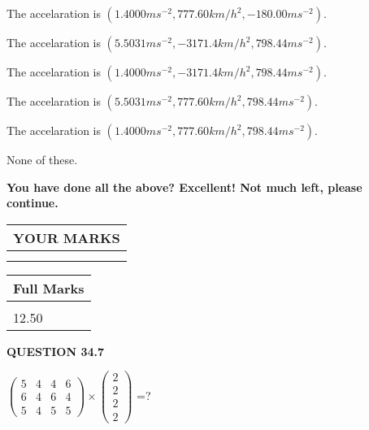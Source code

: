 \documentclass[12pt]{article}
\begin{document}
 
The accelaration is
$(
1.4000ms^{-2},
777.60km/h^2,
-180.00ms^{-2}
).
$
 
 
The accelaration is
$(
5.5031ms^{-2},
-3171.4km/h^2,
798.44ms^{-2}
).
$
 
 
The accelaration is
$(
1.4000ms^{-2},
-3171.4km/h^2,
798.44ms^{-2}
).
$
 
 
The accelaration is
$(
5.5031ms^{-2},
777.60km/h^2,
798.44ms^{-2}
).
$
 
 
The accelaration is
$(
1.4000ms^{-2},
777.60km/h^2,
798.44ms^{-2}
).
$
 
 
 None of these.
 
 
 
 

 
\vspace{0.3in}
   
   
\vspace{0.3in}
{\textbf{\LARGE{You have done all the above? Excellent! Not much left, please continue.}}}
\vspace{0.3in}
   
   
  
\vspace{0.2in}
  
\noindent\begin{tabular}{|l|}
\hline
 YOUR MARKS  \\
\hline
 \\ 
 \\ 
\hline
\end{tabular}
\hspace{0.05in} \begin{tabular}{|l|}
\hline
 Full Marks  \\
\hline
 \\ 
12.50 \\
\hline
\end{tabular}
{\textbf{\Large{QUESTION
34.7 
}}}
  
  
 
$ \left( \begin{array}{ccccccccc}
           5  & 
           4  & 
           4  & 
           6  \\ 
           6  & 
           4  & 
           6  & 
           4  \\ 
           5  & 
           4  & 
           5  & 
           5
\end{array}\right) \times
\left( \begin{array}{c}
           2  \\ 
           2  \\ 
           2  \\ 
           2
\end{array}\right) $ =?
 
\end{document}
